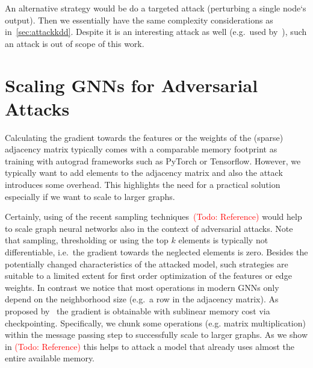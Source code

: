 \documentclass{article} %
\newcommand{\todo}[1]{\textcolor{red}{(Todo: #1)}}
\begin{document}
An alternative strategy would be do a targeted attack (perturbing a single node`s output). Then we essentially have the same complexity considerations as in~\autoref{sec:attackkdd}. Despite it is an interesting attack as well (e.g.~used by~\citet{Zugner2018}), such an attack is out of scope of this work.

\section{Scaling GNNs for Adversarial Attacks}\label{sec:scalegnns}

Calculating the gradient towards the features or the weights of the (sparse) adjacency matrix typically comes with a comparable memory footprint as training with autograd frameworks such as PyTorch or Tensorflow. However, we typically want to add elements to the adjacency matrix and also the attack introduces some overhead. This highlights the need for a practical solution especially if we want to scale to larger graphs. 

Certainly, using of the recent sampling techniques~\todo{Reference} would help to scale graph neural networks also in the context of adversarial attacks. Note that sampling, thresholding or using the top \(k\) elements is typically not differentiable, i.e.~the gradient towards the neglected elements is zero. Besides the potentially changed characteristics of the attacked model, such strategies are suitable to a limited extent for first order optimization of the features or edge weights. In contrast we notice that most operations in modern GNNs only depend on the neighborhood size (e.g.~a row in the adjacency matrix). As proposed by~\citep{Chen} the gradient is obtainable with sublinear memory cost via checkpointing. Specifically, we chunk some operations (e.g. matrix multiplication) within the message passing step to successfully scale to larger graphs. As we show in \todo{Reference} this helps to attack a model that already uses almost the entire available memory.

\end{document}
